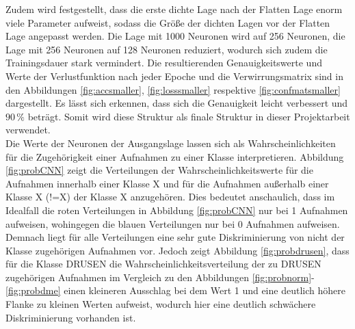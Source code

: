 \setcounter{subfigure}{0} 
Zudem wird festgestellt, dass die erste dichte Lage nach der Flatten Lage enorm viele Parameter aufweist, sodass die Grö{\ss}e der dichten Lagen vor der Flatten Lage angepasst werden. Die Lage mit 1000 Neuronen wird auf 256 Neuronen, die Lage mit 256 Neuronen auf 128 Neuronen reduziert, wodurch sich zudem die Trainingsdauer stark vermindert. Die resultierenden Genauigkeitswerte und Werte der Verlustfunktion nach jeder Epoche und die Verwirrungsmatrix sind in den Abbildungen \ref{fig:accsmaller}, \ref{fig:losssmaller} respektive \ref{fig:confmatsmaller} dargestellt. Es lässt sich erkennen, dass sich die Genauigkeit leicht verbessert und $90\,\%$ beträgt. Somit wird diese Struktur als finale Struktur in dieser Projektarbeit verwendet. \\
Die Werte der Neuronen der Ausgangslage lassen sich als Wahrscheinlichkeiten für die Zugehörigkeit einer Aufnahmen zu einer Klasse interpretieren. Abbildung \ref{fig:probCNN} zeigt die Verteilungen der Wahrscheinlichkeitswerte für die Aufnahmen innerhalb einer Klasse X und für die Aufnahmen au{\ss}erhalb einer Klasse X (!=X) der Klasse X anzugehören. Dies bedeutet anschaulich, dass im Idealfall die roten Verteilungen in Abbildung \ref{fig:probCNN} nur bei 1 Aufnahmen aufweisen, wohingegen die blauen Verteilungen nur bei 0 Aufnahmen aufweisen. Demnach liegt für alle Verteilungen eine sehr gute Diskriminierung von nicht der Klasse zugehörigen Aufnahmen vor. Jedoch zeigt Abbildung \ref{fig:probdrusen}, dass für die Klasse DRUSEN die Wahrscheinlichkeitsverteilung der zu DRUSEN zugehörigen Aufnahmen im Vergleich zu den Abbildungen \ref{fig:probnorm}-\ref{fig:probdme} einen kleineren Ausschlag bei dem Wert 1 und eine deutlich höhere Flanke zu kleinen Werten aufweist, wodurch hier eine deutlich schwächere Diskriminierung vorhanden ist.  
 


